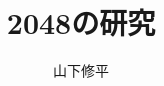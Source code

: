 \documentclass[11pt, dvipdfmx, openany]{jsbook}
\begin{document}
\title{2048の研究}
\author{山下修平}
\maketitle 

\tableofcontents
\clearpage





\appendix



\end{document}
